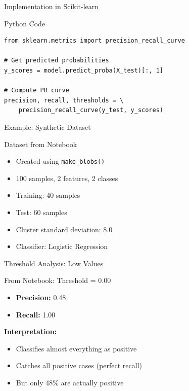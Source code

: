 \documentclass{beamer}
\begin{document}
\begin{frame}[fragile]{Implementation in Scikit-learn}
\begin{block}{Python Code}
\begin{verbatim}
from sklearn.metrics import precision_recall_curve

# Get predicted probabilities
y_scores = model.predict_proba(X_test)[:, 1]

# Compute PR curve
precision, recall, thresholds = \
    precision_recall_curve(y_test, y_scores)
\end{verbatim}
\end{block}
\end{frame}

\begin{frame}{Example: Synthetic Dataset}
\begin{examplebox}{Dataset from Notebook}
\small
\begin{itemize}
    \item Created using \texttt{make\_blobs()}
    \item 100 samples, 2 features, 2 classes
    \item Training: 40 samples
    \item Test: 60 samples
    \item Cluster standard deviation: 8.0
    \item Classifier: Logistic Regression
\end{itemize}
\end{examplebox}
\end{frame}

\begin{frame}{Threshold Analysis: Low Values}
\begin{examplebox}{From Notebook: Threshold = 0.00}
\small
\begin{itemize}
    \item \textbf{Precision:} 0.48
    \item \textbf{Recall:} 1.00
\end{itemize}

\vspace{0.2cm}

\textbf{Interpretation:}
\begin{itemize}
    \item Classifies almost everything as positive
    \item Catches all positive cases (perfect recall)
    \item But only 48\% are actually positive
\end{itemize}
\end{examplebox}
\end{frame}
\end{document}
